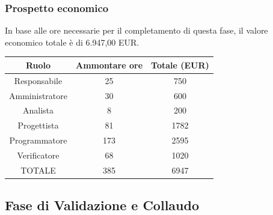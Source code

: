 \subsubsection{Prospetto economico}
In base alle ore necessarie per il completamento di questa fase, il valore economico totale è di 6.947,00 EUR.%
\begin{center}
\begin{tabular}{ |c|c|c|  }
 \hline
 Ruolo 		& Ammontare ore 	& Totale (EUR)\\
 	\hline
 \hline
 	Responsabile	& 25 		& 750\\
	Amministratore	& 30		& 600\\
	Analista		& 8 	& 200\\
	Progettista		& 81		& 1782\\
	Programmatore	& 173		&2595 \\%
	Verificatore	& 68 	& 1020\\
 \hline\hline
 TOTALE		& 385		& 6947\\ %
  \hline
\end{tabular}
\end{center}
\newpage
\subsection{Fase di Validazione e Collaudo}
